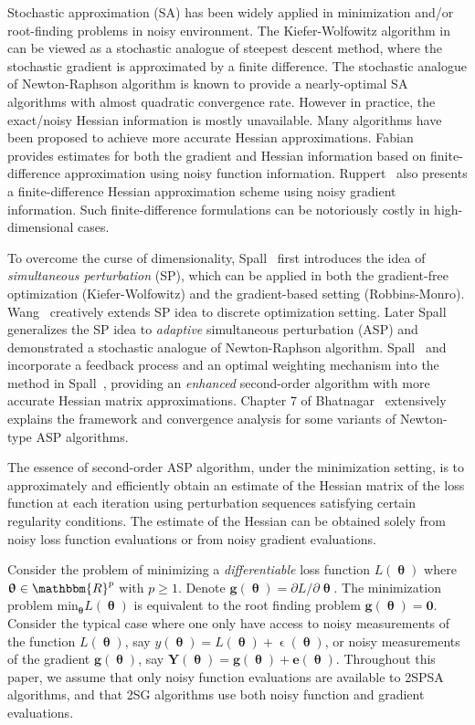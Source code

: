\documentclass[conference,10.3cpt]{IEEEtran}
\begin{document}
Stochastic approximation (SA) has been widely applied in minimization and/or
root-finding problems in noisy environment. The Kiefer-Wolfowitz algorithm in \cite{Kiefer1952} can be viewed as a stochastic analogue of steepest descent method, where the stochastic gradient is approximated by a finite difference. The stochastic analogue of Newton-Raphson algorithm is known to provide a nearly-optimal SA algorithms with almost quadratic convergence rate. However in practice, the exact/noisy Hessian information is mostly unavailable. Many algorithms have been proposed to achieve more accurate Hessian approximations. Fabian~\cite{Fabian1971} provides estimates for both the gradient and Hessian information based on finite-difference approximation using noisy function information. Ruppert~\cite{Ruppert1985} also presents a finite-difference Hessian approximation scheme using noisy gradient information. Such finite-difference formulations can be notoriously costly in high-dimensional cases. 

To overcome the curse of dimensionality, Spall~\cite{Spall1992} first introduces the idea of \textit{simultaneous perturbation} (SP), which can be applied
in both the gradient-free optimization (Kiefer-Wolfowitz) and the
gradient-based setting (Robbins-Monro).  Wang~\cite{Wang2011} creatively extends SP idea to discrete optimization setting. Later Spall~\cite{Spall2000}
generalizes the SP idea to \textit{adaptive} simultaneous perturbation (ASP) and demonstrated a stochastic
analogue of Newton-Raphson algorithm.  Spall~\cite{Spall2007} and \cite{Spall2009} incorporate a feedback process and an optimal weighting mechanism into the method in Spall~\cite{Spall2000}, providing an
\textit{enhanced} second-order algorithm with more accurate Hessian matrix approximations. Chapter 7 of Bhatnagar~\cite{Bhatnagar2012} extensively explains the framework and convergence analysis for some variants of Newton-type ASP algorithms.

The essence of second-order ASP algorithm, under the minimization setting,
is to approximately and efficiently obtain an estimate of the
Hessian matrix of the loss function at each
iteration using perturbation sequences satisfying certain regularity
conditions. The estimate of the Hessian can be obtained solely from
noisy loss function evaluations or from noisy gradient
evaluations.

Consider the problem of minimizing a
\textit{differentiable} loss function $ L(\bm{\uptheta}) $ where
$ \bm{\uptheta} \in \mathbbm{R}^p $ with $ p\ge1 $. Denote
$\bm{g}(\bm{\uptheta})={\partial L}/{\partial \bm{\uptheta}}$. The
minimization problem ${\text{min}}_{\bm{\uptheta}}L(\bm{\uptheta})$ is
equivalent to the root finding problem $\bm{g}(\bm{\uptheta})=\bm{0}$.
Consider the typical case where one only have access to noisy measurements of
the function $ L(\bm{\uptheta}) $, say
$ y(\bm{\uptheta})=L(\bm{\uptheta})+\upvarepsilon(\bm{\uptheta}) $, or
noisy measurements of the gradient $\bm{g}(\bm{\uptheta})$, say
$\bm{Y}(\bm{\uptheta})=\bm{g}(\bm{\uptheta})+\bm{e}(\bm{\uptheta})$. Throughout this paper, we assume that only noisy function
evaluations are available to 2SPSA algorithms, and that 2SG algorithms use both noisy function and gradient evaluations.
\end{document}
